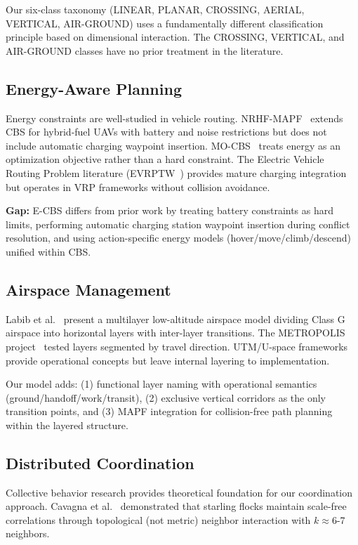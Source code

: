 Our six-class taxonomy (LINEAR, PLANAR, CROSSING, AERIAL, VERTICAL, AIR-GROUND) uses a fundamentally different classification principle based on dimensional interaction. The CROSSING, VERTICAL, and AIR-GROUND classes have no prior treatment in the literature.

\subsection{Energy-Aware Planning}

Energy constraints are well-studied in vehicle routing. NRHF-MAPF~\cite{scott2024nrhf} extends CBS for hybrid-fuel UAVs with battery and noise restrictions but does not include automatic charging waypoint insertion. MO-CBS~\cite{ren2021mocbs} treats energy as an optimization objective rather than a hard constraint. The Electric Vehicle Routing Problem literature (EVRPTW~\cite{schneider2014evrptw}) provides mature charging integration but operates in VRP frameworks without collision avoidance.

\textbf{Gap:} E-CBS differs from prior work by treating battery constraints as hard limits, performing automatic charging station waypoint insertion during conflict resolution, and using action-specific energy models (hover/move/climb/descend) unified within CBS.

\subsection{Airspace Management}

Labib et al.~\cite{labib2019airspace} present a multilayer low-altitude airspace model dividing Class G airspace into horizontal layers with inter-layer transitions. The METROPOLIS project~\cite{sunil2015metropolis} tested layers segmented by travel direction. UTM/U-space frameworks~\cite{nasa2020utm,faa2023uam} provide operational concepts but leave internal layering to implementation.

Our model adds: (1) functional layer naming with operational semantics (ground/handoff/work/transit), (2) exclusive vertical corridors as the only transition points, and (3) MAPF integration for collision-free path planning within the layered structure.

\subsection{Distributed Coordination}

Collective behavior research provides theoretical foundation for our coordination approach. Cavagna et al.~\cite{cavagna2010scale} demonstrated that starling flocks maintain scale-free correlations through topological (not metric) neighbor interaction with $k \approx 6$-7 neighbors.

